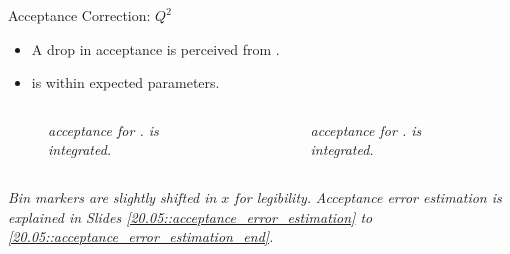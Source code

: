 \begin{frame}{Acceptance Correction: $Q^2$}
    \label{11.52::electron_variables}

    \begin{itemize}
        \item
            A drop in  acceptance is perceived from .

        \item
            \ef{$\nu$} is within expected parameters.
    \end{itemize}

    \vspace{-12pt}
    \begin{columns}[onlytextwidth,T]

    \begin{column}{.49\linewidth}
        \begin{center}
            \begin{figure}[t]
                \scriptsize{\textit{
                     acceptance for .
                    \ef{$\nu$} is integrated.
                }}
            \end{figure}
        \end{center}
    \end{column}

    \begin{column}{.49\linewidth}
        \begin{center}
            \begin{figure}[t]
                \scriptsize{\textit{
                    \ef{$\nu$} acceptance for .
                     is integrated.
                }}
            \end{figure}
        \end{center}
    \end{column}

    \end{columns}

    \begin{flushright}
        \tiny{\textit{Bin markers are slightly shifted in $x$ for legibility.}}
        \tiny{\textit{Acceptance error estimation is explained in Slides \textcolor{efd_purple}{\ref{20.05::acceptance_error_estimation}} to \textcolor{efd_purple}{\ref{20.05::acceptance_error_estimation_end}}.}}
    \end{flushright}
\end{frame}

